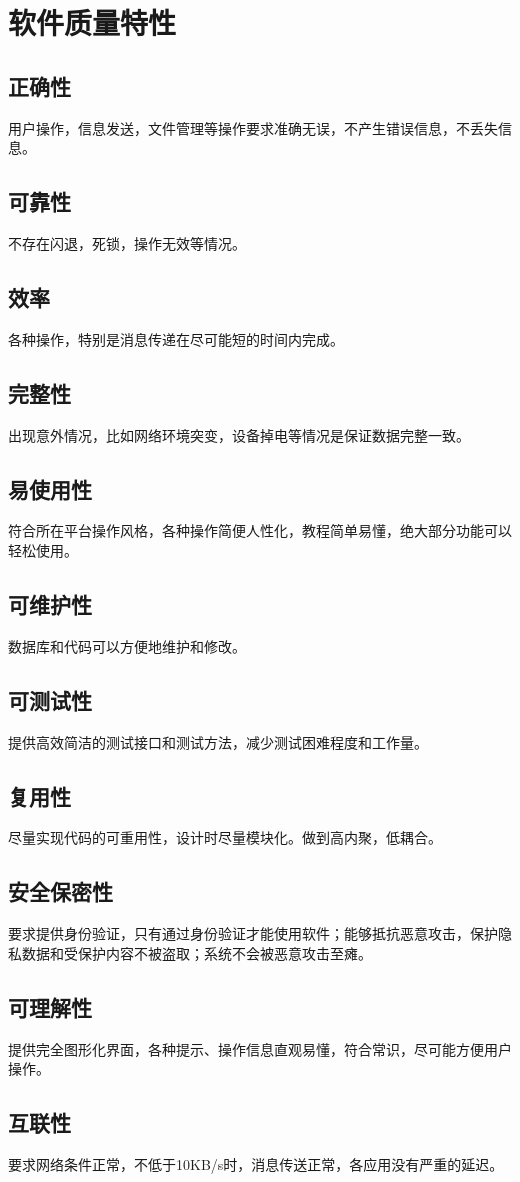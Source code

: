 \chapter{软件质量特性}
\section{正确性}
    用户操作，信息发送，文件管理等操作要求准确无误，不产生错误信息，不丢失信息。
\section{可靠性}
    不存在闪退，死锁，操作无效等情况。
\section{效率}
    各种操作，特别是消息传递在尽可能短的时间内完成。
\section{完整性}
    出现意外情况，比如网络环境突变，设备掉电等情况是保证数据完整一致。
\section{易使用性}
    符合所在平台操作风格，各种操作简便人性化，教程简单易懂，绝大部分功能可以轻松使用。
\section{可维护性}
    数据库和代码可以方便地维护和修改。
\section{可测试性}
    提供高效简洁的测试接口和测试方法，减少测试困难程度和工作量。
\section{复用性}
    尽量实现代码的可重用性，设计时尽量模块化。做到高内聚，低耦合。
\section{安全保密性}
    要求提供身份验证，只有通过身份验证才能使用软件；能够抵抗恶意攻击，保护隐私数据和受保护内容不被盗取；系统不会被恶意攻击至瘫。
\section{可理解性}
    提供完全图形化界面，各种提示、操作信息直观易懂，符合常识，尽可能方便用户操作。
\section{互联性}
    要求网络条件正常，不低于10KB/s时，消息传送正常，各应用没有严重的延迟。


